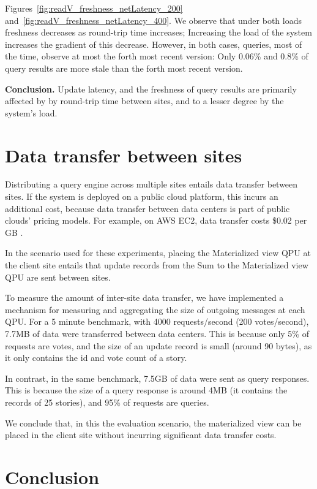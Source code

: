 Figures~\ref{fig:readV_freshness_netLatency_200} and~\ref{fig:readV_freshness_netLatency_400}.
We observe that under both loads freshness decreases as round-trip time increases;
Increasing the load of the system increases the gradient of this decrease.
However, in both cases, queries, most of the time, observe at most the forth most recent version:
Only 0.06\% and 0.8\% of query results are more stale than the forth most recent version.

\medskip
\noindent
\textbf{Conclusion.}
Update latency, and the freshness of query results are primarily affected by
by round-trip time between sites,
and to a lesser degree by the system's load.

\section{Data transfer between sites}
\label{sec:eval_data_transfer}
Distributing a query engine across multiple sites entails data transfer between sites.
If the system is deployed on a public cloud platform, this incurs an additional cost,
because data transfer between data centers is part of public clouds' pricing models.
For example, on AWS EC2, data transfer costs \$0.02 per GB \cite{aws:pricing}.

In the scenario used for these experiments, placing the Materialized view QPU at the client site entails that
update records from the Sum to the Materialized view QPU are sent between sites.

To measure the amount of inter-site data transfer,
we have implemented a mechanism for measuring and aggregating the size of outgoing messages at each QPU.
For a 5 minute benchmark, with 4000 requests/second (200 votes/second), 7.7MB of data were transferred between data centers.
This is because only 5\% of requests are votes, and the size of an update record is small (around 90 bytes),
as it only contains the id and vote count of a story.

In contrast, in the same benchmark, 7.5GB of data were sent as query responses.
This is because the size of a query response is around 4MB
(it contains the records of 25 stories), and 95\% of requests are queries.

We conclude that, in this the evaluation scenario, the materialized view can be placed in the client site without incurring
significant data transfer costs.

\section{Conclusion}

